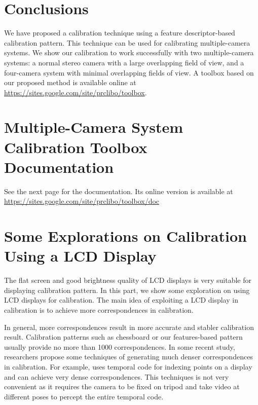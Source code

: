 \documentclass{report}
\begin{document}
\chapter{Conclusions}
We have proposed a calibration technique using a feature descriptor-based calibration pattern. This technique can be used for calibrating multiple-camera systems. We show our calibration to work successfully with two multiple-camera systems: a normal stereo camera with a large overlapping field of view, and a four-camera system with minimal overlapping fields of view. A toolbox based on our proposed method is available online at {\small{\url{https://sites.google.com/site/prclibo/toolbox}}}. 


\appendix
\chapter{Multiple-Camera System Calibration Toolbox Documentation}

See the next page for the documentation. Its online version is available at {\small{\url{https://sites.google.com/site/prclibo/toolbox/doc}}}



\chapter{Some Explorations on Calibration Using a LCD Display}
The flat screen and good brightness quality of LCD displays is very suitable for displaying calibration pattern. In this part, we show some exploration on using LCD displays for calibration. The main idea of exploiting a LCD display in calibration is to achieve more correspondences in calibration. 

In general, more correspondences result in more accurate and stabler calibration result. Calibration patterns such as chessboard or our features-based pattern usually provide no more than 1000 correspondences. In some recent study, researchers propose some techniques of generating much denser correspondences in calibration.  For example, \cite{grosse2012camera} uses temporal code for indexing points on a display and can achieve very dense correspondences. This techniques is not very convenient as it requires the camera to be fixed on tripod and take video at different poses to percept the entire temporal code. 
\end{document}

